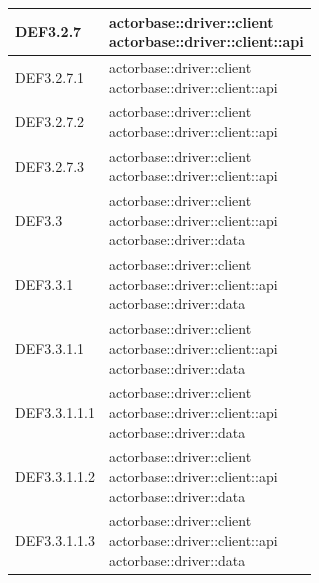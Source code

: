 \documentclass{scalatekids-article}
\begin{document}
\begin{longtable}[H]{|p{6cm}|p{11cm}|}
\hline
DEF3.2.7 & \multiLineCell[t]{actorbase::driver::client\\actorbase::driver::client::api\\}\\
\hline
DEF3.2.7.1 & \multiLineCell[t]{actorbase::driver::client\\actorbase::driver::client::api\\}\\
\hline
DEF3.2.7.2 & \multiLineCell[t]{actorbase::driver::client\\actorbase::driver::client::api\\}\\
\hline
DEF3.2.7.3 & \multiLineCell[t]{actorbase::driver::client\\actorbase::driver::client::api\\}\\
\hline
DEF3.3 & \multiLineCell[t]{actorbase::driver::client\\actorbase::driver::client::api\\actorbase::driver::data\\}\\
\hline
DEF3.3.1 & \multiLineCell[t]{actorbase::driver::client\\actorbase::driver::client::api\\actorbase::driver::data\\}\\
\hline
DEF3.3.1.1 & \multiLineCell[t]{actorbase::driver::client\\actorbase::driver::client::api\\actorbase::driver::data\\}\\
\hline
DEF3.3.1.1.1 & \multiLineCell[t]{actorbase::driver::client\\actorbase::driver::client::api\\actorbase::driver::data\\}\\
\hline
DEF3.3.1.1.2 & \multiLineCell[t]{actorbase::driver::client\\actorbase::driver::client::api\\actorbase::driver::data\\}\\
\hline
DEF3.3.1.1.3 & \multiLineCell[t]{actorbase::driver::client\\actorbase::driver::client::api\\actorbase::driver::data\\}\\
\hline

\end{longtable}
\end{document}
